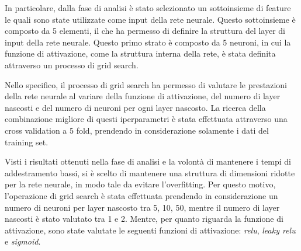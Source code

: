 In particolare, dalla fase di analisi è stato selezionato un sottoinsieme di
feature le quali sono state utilizzate come input della rete neurale. Questo 
sottoinsieme è composto da 5 elementi, il che ha permesso di definire la struttura 
del layer di input della rete neurale. Questo primo strato è composto da 5 neuroni,
in cui la funzione di attivazione, come la struttura interna della rete, è stata
definita attraverso un processo di grid search.

Nello specifico, il processo di grid search ha permesso di valutare le prestazioni
della rete neurale al variare della funzione di attivazione, del numero di layer
nascosti e del numero di neuroni per ogni layer nascosto. La ricerca della 
combinazione migliore di questi iperparametri è stata effettuata attraverso una
cross validation a 5 fold, prendendo in considerazione solamente i dati del
training set.

Visti i risultati ottenuti nella fase di analisi e la volontà di mantenere i 
tempi di addestramento bassi, si è scelto di mantenere una struttura di dimensioni 
ridotte per la rete neurale, in modo tale da evitare l'overfitting. Per questo
motivo, l'operazione di grid search è stata effettuata prendendo in considerazione
un numero di neuroni per layer nascosto tra 5, 10, 50, mentre il numero di
layer nascosti è stato valutato tra 1 e 2. Mentre, per quanto riguarda la funzione 
di attivazione, sono state valutate le seguenti funzioni di attivazione: 
\textit{relu}, \textit{leaky relu} e \textit{sigmoid}.

